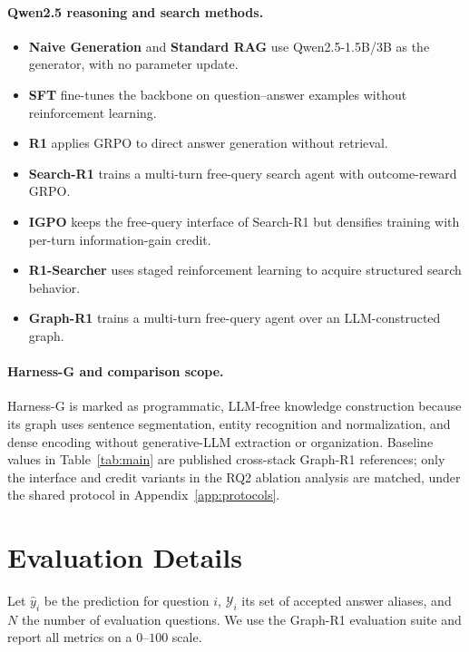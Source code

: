 \documentclass[letterpaper]{article} %
\begin{document}
\paragraph{Qwen2.5 reasoning and search methods.}
\begin{itemize}
    \item \textbf{Naive Generation} and \textbf{Standard RAG} use Qwen2.5-1.5B/3B as the generator, with no parameter update.
    \item \textbf{SFT} fine-tunes the backbone on question--answer examples without reinforcement learning.
    \item \textbf{R1} applies GRPO \citep{shao2024deepseekmath} to direct answer generation without retrieval.
    \item \textbf{Search-R1} \citep{jin2025searchr1} trains a multi-turn free-query search agent with outcome-reward GRPO.
    \item \textbf{IGPO} \citep{igpo2025} keeps the free-query interface of Search-R1 but densifies training with per-turn information-gain credit.
    \item \textbf{R1-Searcher} \citep{song2025r1searcher} uses staged reinforcement learning to acquire structured search behavior.
    \item \textbf{Graph-R1} \citep{luo2025graphr1} trains a multi-turn free-query agent over an LLM-constructed graph.
\end{itemize}

\paragraph{Harness-G and comparison scope.}
Harness-G is marked as programmatic, LLM-free knowledge construction because its graph uses sentence segmentation, entity recognition and normalization, and dense encoding without generative-LLM extraction or organization.
Baseline values in Table~\ref{tab:main} are published cross-stack Graph-R1 references; only the interface and credit variants in the RQ2 ablation analysis are matched, under the shared protocol in Appendix~\ref{app:protocols}.

\section{Evaluation Details}
\label{app:metrics}

Let $\hat y_i$ be the prediction for question $i$, $\mathcal{Y}_i$ its set of accepted answer aliases, and $N$ the number of evaluation questions.
We use the Graph-R1 evaluation suite and report all metrics on a $0$--$100$ scale.
\end{document}
